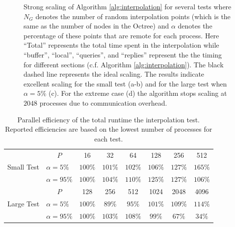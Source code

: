 \begin{figure}[htbp]
\begin{center}
	\end{center}
	\caption{Strong scaling of Algorithm \ref{alg:interpolation} for several tests where $N_G$ denotes the number of random interpolation points (which is the same as the number of nodes in the Octree) and $\alpha$ denotes the percentage of these points that are remote for each process. Here ``Total'' represents the total time spent in the interpolation while ``buffer'', ``local'', ``queries'', and ``replies'' represent the the timing for different sections (c.f. Algorithm \ref{alg:interpolation}). The black dashed line represents the ideal scaling. The results indicate excellent scaling for the small test (a-b) and for the large test when $\alpha = 5\%$ (c). For the extreme case (d) the algorithm stops scaling at $2048$ processes due to communication overhead.}
	\label{fig:interpolation}
\end{figure}

\begin{table}
\centering
	\begin{tabular}{|l|l|cccccc|}
	\hline
	\multirow{3}{*}{Small Test} & \multicolumn{1}{|c|}{$P$} & 16      & 32      & 64      & 128     & 256    & 512 \\
	\cline{2-8} 	                            
	                            & $\alpha = 5\%$   & $100\%$ & $101\%$ & $102\%$ & $106\%$ & $127\%$& $165\%$ \\
	                            & $\alpha = 95\%$  & $100\%$ & $104\%$ & $110\%$ & $125\%$ & $127\%$& $106\%$ \\ 	                            
	\hline
	\multirow{3}{*}{Large Test} & \multicolumn{1}{|c|}{$P$} & 128     & 256     & 512     & 1024    & 2048   & 4096 \\
	\cline{2-8} 	                            
	                            & $\alpha = 5\%$   & $100\%$ & $89\%$  & $95\%$  & $101\%$ & $109\%$& $114\%$ \\
	                            & $\alpha = 95\%$  & $100\%$ & $103\%$ & $108\%$ & $99\%$  & $67\%$ & $34\%$ \\
	\hline
	\end{tabular}
	\caption{Parallel efficiency of the total runtime the interpolation test. Reported efficiencies are based on the lowest number of processes for each test.}
	\label{tab:scaling_interpolation}
\end{table}

